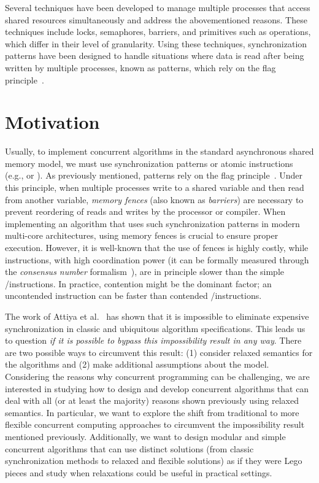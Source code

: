 Several techniques have been developed to manage multiple processes that access shared resources simultaneously and address the abovementioned reasons. These techniques include locks, semaphores, barriers, and primitives such as \RMW operations, which differ in their level of granularity. Using these techniques, synchronization patterns have been designed to handle situations where data is read after being written by multiple processes, known as \RAW patterns, which rely on the flag principle~\cite{DBLP_books_daglib_0020056}.


\section{\label{section:Motivation}Motivation}

Usually, to implement concurrent algorithms in the standard asynchronous shared memory model, we must use \RAW synchronization patterns or atomic \RMW instructions (e.g., \CAS or \TAS). As previously mentioned, \RAW patterns rely on the flag principle~\cite{DBLP_books_daglib_0020056}. Under this principle, when multiple processes write to a shared variable and then read from another variable, \textit{memory fences} (also known as \textit{barriers}) are necessary to prevent reordering of reads and writes by the processor or compiler. When implementing an algorithm that uses such synchronization patterns in modern multi-core architectures, using memory fences is crucial to ensure proper execution. However, it is well-known that the use of fences is highly costly, while \RMW instructions, with high coordination power (it can be formally measured through the \textit{consensus number} formalism~\cite{DBLP_journals_toplas_Herlihy91}), are in principle slower than the simple \R/\W instructions. In practice, contention might be the dominant factor; an uncontended \RMW instruction can be faster than contended \R/\W instructions.

The work of Attiya et al.~\cite{DBLP_conf_popl_AttiyaGHKMV11} has shown that it is impossible to eliminate expensive synchronization in classic and ubiquitous algorithm specifications. This leads us to question \textit{if it is possible to bypass this impossibility result in any way}. There are two possible ways to circumvent this result: (1) consider relaxed semantics for the algorithms and (2) make additional assumptions about the model. Considering the reasons why concurrent programming can be challenging, we are interested in studying how to design and develop concurrent algorithms that can deal with all (or at least the majority) reasons shown previously using relaxed semantics. In particular, we want to explore the shift from traditional to more flexible concurrent computing approaches to circumvent the impossibility result mentioned previously. Additionally, we want to design modular and simple concurrent algorithms that can use distinct solutions (from classic synchronization methods to relaxed and flexible solutions) as if they were Lego pieces and study when relaxations could be useful in practical settings.

